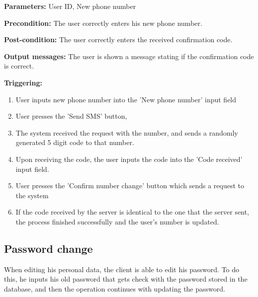 \begin{description}

\item \textbf{Parameters:} User ID, New phone number

\item \textbf{Precondition:} The user correctly enters his new phone number.

\item \textbf{Post-condition:} The user correctly enters the received
confirmation code.

\item \textbf{Output messages:} The user is shown a message stating if the
confirmation code is correct.

\item \textbf{Triggering:}
\begin{enumerate}
\item User inputs new phone number into the 'New phone number' input field

\item User presses the 'Send SMS' button,

\item The system received the request with the number, and sends a randomly
generated 5 digit code to that number.

\item Upon receiving the code, the user inputs the code into the 'Code received'
input field.

\item User presses the 'Confirm number change' button which sends a request to
the system

\item If the code received by the server is identical to the one that the server
sent, the process finished successfully and the user's number is updated.

\end{enumerate}

\end{description}

\subsection{Password change}

 When editing his personal data, the client is able to edit his password. To do
 this, he inputs his old password that gets check with the password stored in
 the database, and then the operation continues with updating the password.

